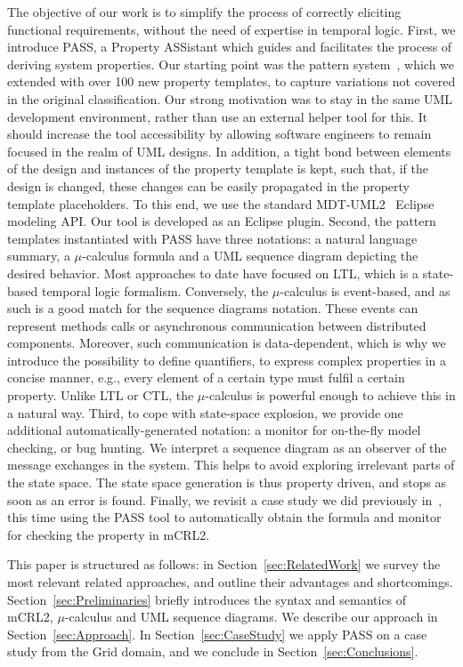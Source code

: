 \documentclass[letter]{llncs}
\begin{document}
The objective of our work is to simplify the process of correctly eliciting
functional requirements, without the need of expertise in temporal logic. 
First, we introduce PASS, a Property ASSistant which guides and facilitates the process of deriving
system properties. Our starting point was the pattern system~\cite{Dwyer:1999:PPS:302405.302672},
which we extended with over 100 new property templates, to capture variations not covered 
in the original classification. Our strong motivation was to stay
in the same UML development environment, rather than use an external helper tool for this.
It should increase the tool accessibility by allowing software engineers to remain focused in the realm of UML designs.
In addition, a tight bond between elements of the design and instances of the property template is kept, such that, if the 
design is changed, these changes can be easily propagated in the property template placeholders. 
To this end, we use the standard MDT-UML2~\cite{MDTUML2} Eclipse modeling API. Our tool is developed as an Eclipse plugin.
Second, the pattern templates instantiated with PASS have three notations: a natural language summary, a $\mu$-calculus formula
and a UML sequence diagram depicting the desired behavior. Most approaches to date 
have focused on LTL, which is a state-based temporal logic formalism. Conversely,
the $\mu$-calculus is event-based, and as such is a good match for the sequence diagrams notation. 
These events can represent methods calls or asynchronous communication between distributed components.
Moreover, such communication is data-dependent, which is why we introduce
the possibility to define quantifiers, to express complex properties in a concise manner, e.g., every
element of a certain type must fulfil a certain property. 
Unlike LTL or CTL,  the $\mu$-calculus is powerful enough
to achieve this in a natural way. Third, to cope with state-space explosion,
we provide one additional automatically-generated notation: a monitor for on-the-fly model checking, or bug hunting.
We interpret a sequence diagram as an observer of the message exchanges in the system.
This helps to avoid exploring irrelevant parts of the state space. The state space
generation is thus property driven, and stops as soon as an error is found.
Finally, we revisit a case study we did previously in~\cite{DBLP:dblp_conf/nfm/RemenskaTWHVCB13}, this time
using the PASS tool to automatically obtain the formula and monitor for checking the property in mCRL2.

This paper is structured as follows: in Section~\ref{sec:RelatedWork} we
 survey the most relevant related approaches,
and outline their advantages and shortcomings. Section~\ref{sec:Preliminaries} briefly introduces the
syntax and semantics of mCRL2, $\mu$-calculus and UML sequence diagrams.
We describe our approach in Section~\ref{sec:Approach}.
In Section~\ref{sec:CaseStudy} we apply PASS on a case study from the Grid domain, and we conclude in Section~\ref{sec:Conclusions}.
\end{document}
